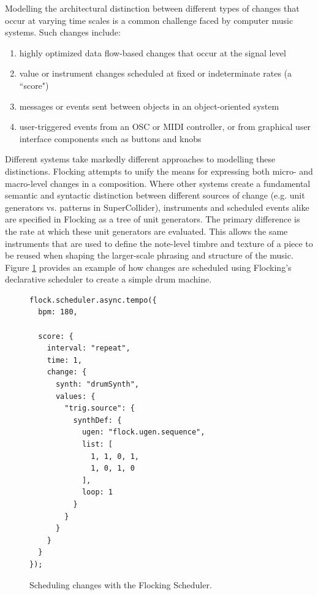 \documentclass{article}
\begin{document}
Modelling the architectural distinction between different types of changes that occur at varying time scales is a common challenge faced by computer music systems. Such changes include:

\begin{enumerate}
\item highly optimized data flow-based changes that occur at the signal level
\item value or instrument changes scheduled at fixed or indeterminate rates (a ``score")
\item messages or events sent between objects in an object-oriented system
\item user-triggered events from an OSC or MIDI controller, or from graphical user interface components such as buttons and knobs
\end{enumerate}

Different systems take markedly different approaches to modelling these distinctions. Flocking attempts to unify the means for expressing both micro- and macro-level changes in a composition. Where other systems create a fundamental semantic and syntactic distinction between different sources of change (e.g. unit generators vs. patterns in SuperCollider), instruments and scheduled events alike are specified in Flocking as a tree of unit generators. The primary difference is the rate at which these unit generators are evaluated. This allows the same instruments that are used to define the note-level timbre and texture of a piece to be reused when shaping the larger-scale phrasing and structure of the music.  Figure \ref{fig:schedulerEx} provides an example of how changes are scheduled using Flocking's declarative scheduler to create a simple drum machine.

\begin{figure}[h!]
    \begin{verbatim}
flock.scheduler.async.tempo({
  bpm: 180,

  score: {
    interval: "repeat",
    time: 1,
    change: {
      synth: "drumSynth",
      values: {
        "trig.source": {
          synthDef: {
            ugen: "flock.ugen.sequence",
            list: [
              1, 1, 0, 1,
              1, 0, 1, 0
            ],
            loop: 1
          }
        }
      }
    }
  }
});
    \end{verbatim}
    \caption{Scheduling changes with the Flocking Scheduler.\label{fig:schedulerEx}}
\end{figure}
\end{document}

